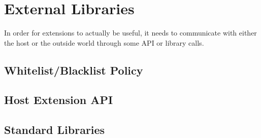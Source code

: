 \chapter{External Libraries}

In order for extensions to actually be useful, it needs to communicate with
either the host or the outside world through some API or library calls.

\section{Whitelist/Blacklist Policy}



\section{Host Extension API}

\section{Standard Libraries}

